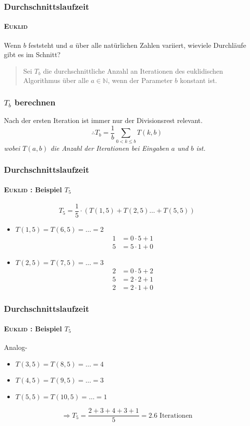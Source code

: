 \documentclass[•]{beamer}
\begin{document}
\begin{frame}
	\frametitle{Durchschnittslaufzeit}
	\framesubtitle{\textsc{Euklid}}
	Wenn $b$ feststeht und $a$ \"uber alle nat\"urlichen Zahlen variiert, wieviele Durchl\"aufe gibt es im Schnitt?\vspace{10pt}
	\begin{quote}
	Sei $T_{b}$ die durchschnittliche Anzahl an Iterationen des euklidischen Algorithmus \"uber alle $a \in \mathbb{N}$, wenn der Parameter $b$ konstant ist.
	\end{quote}
	\end{frame}
\begin{frame}
\frametitle{$T_b$ berechnen}
 Nach der ersten Iteration ist immer nur der Divisionsrest relevant.
	$$\therefore T_{b} = \frac{1}{b} \sum_{0 < k\leq b} T(k,b)$$
	\textit{ wobei $T(a,b)$ die Anzahl der Iterationen bei Eingaben $a$ und $b$ ist.}
\end{frame}
\begin{frame}	
		\frametitle{Durchschnittslaufzeit}
	\framesubtitle{\textsc{Euklid} : Beispiel $T_5$}
$$T_5 = \frac{1}{5}\cdot (T(1,5) + T(2,5) \dots +T(5,5))$$	
	\begin{itemize}
	\item $T(1,5) = T(6,5) = \dots = 2$
	\setcounter{equation}{0}
	\begin{align}
	1&=0\cdot 5 + 1	\\
	5&=5\cdot 1 + 0
	\end{align}
	
	\setcounter{equation}{0}
	\item $T(2,5) = T(7,5) = \dots = 3$
	\begin{align}
	2&=0\cdot 5 + 2	\\
	5&=2\cdot 2 + 1 \\
	2&= 2\cdot 1+0
	\end{align}
	\end{itemize}
	
	\end{frame}
	

\begin{frame}	
		\frametitle{Durchschnittslaufzeit}
	\framesubtitle{\textsc{Euklid} : Beispiel $T_5$}
	Analog-
	\begin{itemize}
	\item $T(3,5) = T(8,5) = \dots = 4$
	\item $T(4,5) = T(9,5) = \dots = 3$
	\item $T(5,5) = T(10,5) = \dots = 1$
	\end{itemize}
	\vspace{20pt}
	 $$\Rightarrow T_5 = \frac{2+3+4+3+1}{5} = 2.6\text{ Iterationen}$$
	\end{frame}	
	
\end{document}
